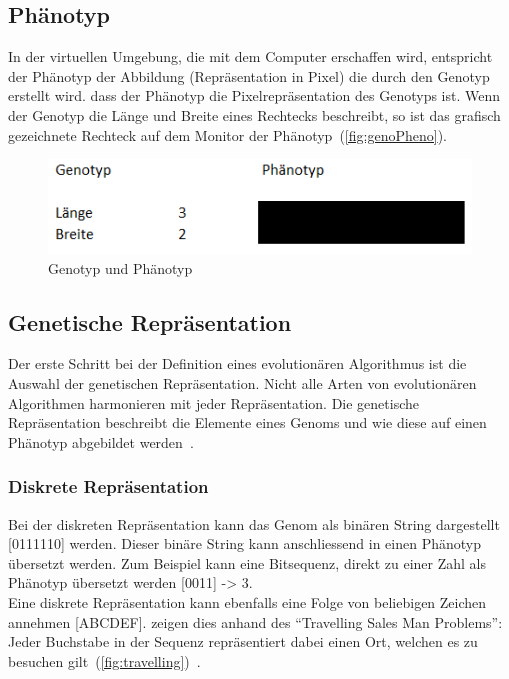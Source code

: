     \subsection{Phänotyp\label{sub:introPhenotyp}}

      In der virtuellen Umgebung, die mit dem Computer erschaffen wird,
      entspricht der Phänotyp der Abbildung (Repräsentation in Pixel) die durch den Genotyp erstellt wird.
      dass der Phänotyp die Pixelrepräsentation des Genotyps ist.
      Wenn der Genotyp die Länge und Breite eines Rechtecks beschreibt,
      so ist das grafisch gezeichnete Rechteck auf dem Monitor der Phänotyp~(\vref{fig:genoPheno}).

      \begin{figure}[H]
        \includegraphics[scale=1,center]{graphics/genotyp_phenotyp}
        \caption{Genotyp und Phänotyp\label{fig:genoPheno}}
      \end{figure}

    \subsection{Genetische Repräsentation}

      Der erste Schritt bei der Definition eines evolutionären Algorithmus ist die Auswahl der genetischen Repräsentation.
      Nicht alle Arten von evolutionären Algorithmen harmonieren mit jeder Repräsentation.
      Die genetische Repräsentation beschreibt die Elemente eines Genoms und
      wie diese auf einen Phänotyp abgebildet werden~\cite[S.16]{book:bioInspired}.

      \subsubsection{Diskrete Repräsentation\label{subsub:GeneticRepresentationDiscrete}}

        Bei der diskreten Repräsentation kann das Genom als binären String dargestellt [0111110] werden.
        Dieser binäre String kann anschliessend in einen Phänotyp übersetzt werden.
        Zum Beispiel kann eine Bitsequenz, direkt zu einer Zahl als Phänotyp übersetzt werden [0011] -> 3.
        \\
        Eine diskrete Repräsentation kann ebenfalls eine Folge von beliebigen Zeichen annehmen [ABCDEF].
        \citet{book:bioInspired} zeigen dies anhand des ``Travelling Sales Man Problems'':
        Jeder Buchstabe in der Sequenz repräsentiert dabei einen Ort,
        welchen es zu besuchen gilt~(\vref{fig:travelling})~\cite[S.18]{book:bioInspired}.

